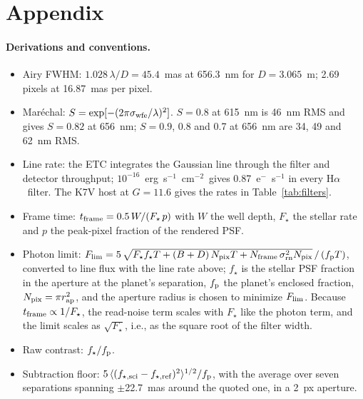 \documentclass[11pt]{article}
\newcommand{\Ha}{H$\alpha$}
\newcommand{\ergcgs}{erg~s$^{-1}$~cm$^{-2}$}
\begin{document}
\section*{Appendix}

\paragraph{Derivations and conventions.}
\begin{itemize}[leftmargin=*]
  \item Airy FWHM: $1.028\,\lambda/D = 45.4$~mas at 656.3~nm for $D = 3.065$~m; 2.69 pixels at 16.87~mas per pixel.
  \item Mar\'echal: $S = \exp[-(2\pi\sigma_{\rm wfe}/\lambda)^2]$. $S = 0.8$ at 615~nm is 46~nm RMS and gives $S = 0.82$ at 656~nm; $S = 0.9$, 0.8 and 0.7 at 656~nm are 34, 49 and 62~nm RMS.
  \item Line rate: the ETC integrates the Gaussian line through the filter and detector throughput; $10^{-16}$~\ergcgs\ gives 0.87~e$^-$~s$^{-1}$ in every \Ha\ filter. The K7V host at $G = 11.6$ gives the rates in Table~\ref{tab:filters}.
  \item Frame time: $t_{\rm frame} = 0.5\,W / (F_\star\,p)$ with $W$ the well depth, $F_\star$ the stellar rate and $p$ the peak-pixel fraction of the rendered PSF.
  \item Photon limit: $F_{\rm lim} = 5\,\sqrt{F_\star f_\star T + (B + D)\,N_{\rm pix} T + N_{\rm frame}\,\sigma_{\rm rn}^2 N_{\rm pix}}\,/\,(f_{\rm p} T)$, converted to line flux with the line rate above; $f_\star$ is the stellar PSF fraction in the aperture at the planet's separation, $f_{\rm p}$ the planet's enclosed fraction, $N_{\rm pix} = \pi r_{\rm ap}^2$, and the aperture radius is chosen to minimize $F_{\rm lim}$. Because $t_{\rm frame} \propto 1/F_\star$, the read-noise term scales with $F_\star$ like the photon term, and the limit scales as $\sqrt{F_\star}$, i.e., as the square root of the filter width.
  \item Raw contrast: $f_\star / f_{\rm p}$.
  \item Subtraction floor: $5\,\langle (f_{\star,{\rm sci}} - f_{\star,{\rm ref}})^2 \rangle^{1/2} / f_{\rm p}$, with the average over seven separations spanning $\pm$22.7~mas around the quoted one, in a 2~px aperture.
\end{itemize}
\end{document}
